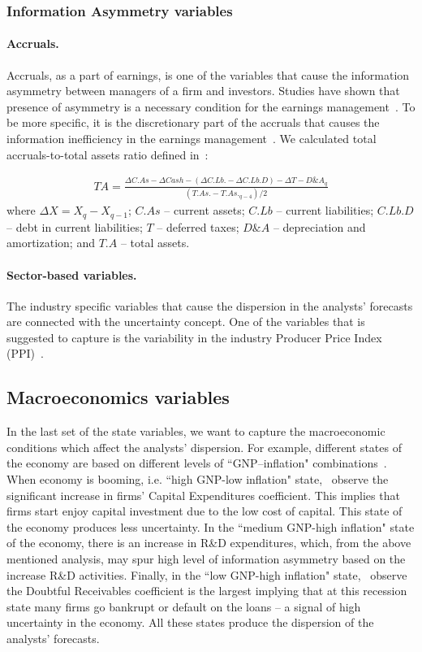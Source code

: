 \subsubsection{Information Asymmetry variables}
\paragraph{Accruals.}
Accruals, as a part of  earnings, is one of the variables that cause the information asymmetry between managers of a firm and investors. Studies have shown that presence of asymmetry is a necessary condition for the earnings management~\citep{trueman1988,richardson2000}. To be more specific, it is the discretionary part of the accruals that causes  the information inefficiency  in the earnings management~\citep{richardson2000,ahmed2005}. We calculated total accruals-to-total assets ratio defined in~\cite{creamer2009}:

\begin{eqnarray}
TA=\frac{\Delta C.As - \Delta Cash - (\Delta C.Lb. - \Delta C.Lb.D) - \Delta T - D\& A_q}{(T.As. - T.As._{q-4})/2}
\end{eqnarray}
where $\Delta X=X_q-X_{q-1}$; $C.As$ -- current assets; $C.Lb$ -- current liabilities; $C.Lb.D$ -- debt in current liabilities; $T$ -- deferred taxes; $D\&A$ -- depreciation and amortization; and $T.A$ -- total assets.



\paragraph{Sector-based variables.} The industry specific variables that cause the dispersion in the analysts' forecasts are connected  with the uncertainty concept. One of the variables that is suggested to capture is the variability in the industry Producer Price Index (PPI)~\citep{henley2003}.


\subsection{Macroeconomics variables}
In the last set of the state variables, we want to capture the macroeconomic conditions which affect the analysts' dispersion. For example, different states of the economy are based on  different levels of ``GNP--inflation" combinations~\citep{lev1993,hope2005}. When economy is booming, i.e. ``high GNP-low inflation" state,~\cite{lev1993} observe the significant increase in firms' Capital Expenditures coefficient. This implies that firms start enjoy capital investment due to the low cost of capital. This state of the economy produces less uncertainty. In the ``medium GNP-high inflation" state of the economy, there is an increase in R\&D expenditures, which, from the above mentioned analysis, may spur high level of information asymmetry based on the increase R\&D activities. Finally, in the ``low GNP-high inflation" state,~\cite{lev1993} observe the Doubtful Receivables coefficient is the largest implying that at this recession state many firms go bankrupt or default on the loans -- a signal of high uncertainty in the economy. All these states produce the dispersion of the analysts' forecasts.

